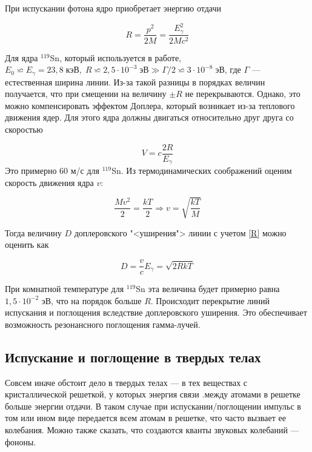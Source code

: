 \documentclass[a4paper, 12pt]{article}
\begin{document}
	При испускании фотона ядро приобретает энергию отдачи

	\begin{equation}\label{R}
	R = \dfrac{p^2}{2M} = \dfrac{E_\gamma^2}{2Mc^2}
	\end{equation}

	Для ядра $ ^{119} $Sn, который используется в работе, $E_0
        \backsimeq E_\gamma = 23,8 \; кэВ, \; R \backsimeq 2,5 \cdot
        10^{-3} \; эВ \gg \Gamma/2 \backsimeq 3 \cdot 10^{-8} \; эВ $, где $ \Gamma $ --- естественная ширина линии. Из-за такой разницы в порядках величин получается, что при смещении на величину $ \pm R $ не перекрываются. Однако, это можно компенсировать эффектом Доплера, который возникает из-за теплового движения ядер. Для этого ядра должны двигаться относительно друг друга со скоростью

	\begin{equation}\label{V}
	V = c \dfrac{2R}{E_\gamma}
	\end{equation}
	 Это примерно 60 м/с для $ ^{119} $Sn. Из термодинамических соображений оценим скорость движения ядра $ v $:

	\begin{equation}\label{}
	\dfrac{Mv^2}{2} = \dfrac{kT}{2} \Rightarrow v = \sqrt{\dfrac{kT}{M}}
	\end{equation}

	Тогда величину $ D $ доплеровского "<уширения"> линии с учетом \eqref{R} можно оценить как

	\begin{equation}\label{D}
	D = \dfrac{v}{c} E_\gamma = \sqrt{2RkT}
	\end{equation}

	При комнатной температуре для $ ^{119} $Sn эта величина будет
        примерно равна $ 1,5 \cdot 10^{-2} $ эВ, что на порядок больше $ R $. Происходит перекрытие линий испускания и поглощения вследствие доплеровского уширения. Это обеспечивает возможность резонансного поглощения гамма-лучей.

	\subsection{Испускание и поглощение в твердых телах}

	Совсем иначе обстоит дело в твердых телах --- в тех веществах с кристаллической решеткой, у которых энергия связи .между атомами в решетке больше энергии отдачи. В таком случае при испускании/поглощении импульс  в том или ином виде передается всем атомам в решетке, что часто вызвает ее колебания. Можно также сказать, что создаются кванты звуковых колебаний --- фононы.
\end{document}

